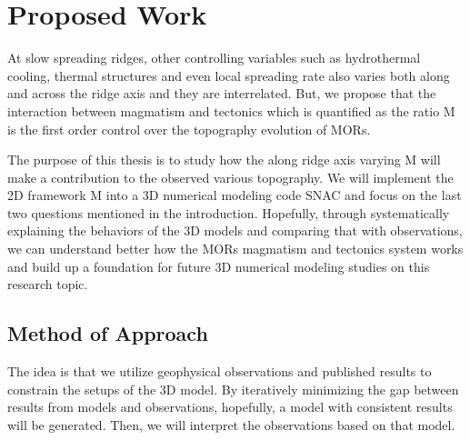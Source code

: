 \documentclass[12pt]{article}
\begin{document}
\break
\section{Proposed Work}
\label{ch:purpose}

At slow spreading ridges, other controlling variables such as hydrothermal cooling, thermal structures and even local spreading rate \citep{Baines2008} also varies both along and across the ridge axis and they are interrelated. But, we propose that the interaction between magmatism and tectonics which is quantified as the ratio M is the first order control over the topography evolution of MORs. 

The purpose of this thesis is to study how the along ridge axis varying M will make a contribution to the observed various topography. We will implement the 2D framework M into a 3D numerical modeling code SNAC \citep{Choi2008} and focus on the last two questions mentioned in the introduction. Hopefully, through systematically explaining the behaviors of the 3D models and comparing that with observations, we can understand better how the MORs magmatism and tectonics system works and build up a foundation for future 3D numerical modeling studies on this research topic.



\break
\subsection{Method of Approach}
\label{ch:method}

The idea is that we utilize geophysical observations and published results to constrain the setups of the 3D model. By iteratively minimizing the gap between results from models and observations, hopefully, a model with consistent results will be generated. Then, we will interpret the observations based on that model.
\end{document}
